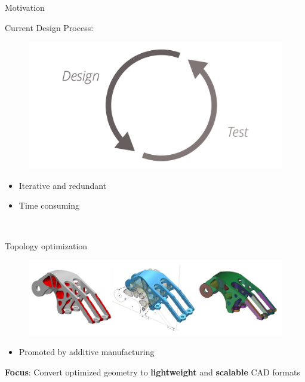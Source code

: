 \begin{frame}{Motivation}
	\begin{multicols}{2}
		Current Design Process:
		\begin{figure}
			\includegraphics[width=0.8\linewidth]{Pictures/Motivation/DesignTest.png}
		\end{figure}
		\begin{itemize}
			\item Iterative and redundant
			\item Time consuming
		\end{itemize}~\\

		\vfill
		\columnbreak
		\pause

		Topology optimization
		\begin{figure}
			\includegraphics[width=0.9\linewidth]{Pictures/Motivation/TopOpt.jpg}
		\end{figure}
		\begin{itemize}
			\item Promoted by additive manufacturing
		\end{itemize}

		\pause
	\end{multicols}
	\begin{tcolorbox}
		\textbf{Focus}: Convert optimized geometry to \textbf{lightweight} and \textbf{scalable} CAD formats
	\end{tcolorbox}
\end{frame}


